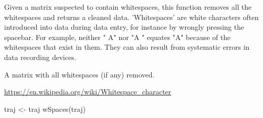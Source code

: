 \documentclass[a4paper]{book}
\begin{document}
%
\begin{Details}\relax
Given a matrix suspected to contain whitespaces, this function removes all the whitespaces and returns a cleaned data. ’Whitespaces’ are white characters often introduced into data during data entry, for instance by wrongly pressing the spacebar. For example, neither " A" nor "A " equates "A" because of the whitespaces that exist in them. They can also result from systematic errors in data recording devices.
\end{Details}
%
\begin{Value}
A matrix with all whitespaces (if any) removed.
\end{Value}
%
\begin{References}\relax
\url{https://en.wikipedia.org/wiki/Whitespace_character}
\end{References}
%
\begin{Examples}
\begin{ExampleCode}
traj <- traj
wSpaces(traj)
\end{ExampleCode}
\end{Examples}
\printindex{}
\end{document}
